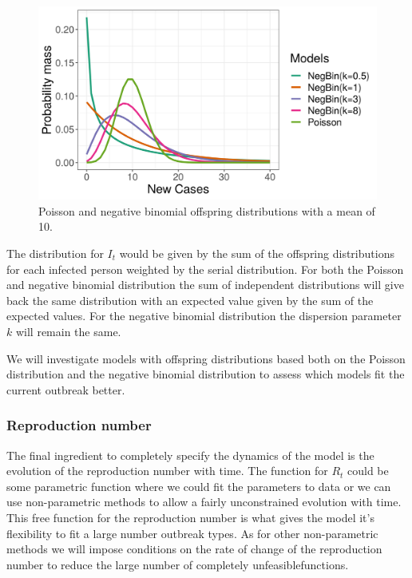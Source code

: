 \documentclass[12pt]{article}
\begin{document}
\begin{figure}[h]
  \centering
  \includegraphics[width=\textwidth]{../output/prob_dist.png}
  \caption{Poisson and negative binomial offspring distributions with a mean of 10.}
  \label{fig:offspring}
\end{figure}

The distribution for $I_t$ would be given by the sum of the offspring distributions for each infected person weighted by the serial distribution. For both the Poisson and negative binomial distribution the sum of independent distributions will give back the same distribution with an expected value given by the sum of the expected values. For the negative binomial distribution the dispersion parameter $k$ will remain the same. 

We will investigate models with offspring distributions based both on the Poisson distribution and the negative binomial distribution to assess which models fit the current outbreak better.

\subsubsection{Reproduction number}
The final ingredient to completely specify the dynamics of the model is the evolution of the reproduction number with time. The function for $R_t$ could be some parametric function where we could fit the parameters to data or we can use non-parametric methods to allow a fairly unconstrained evolution with time. This free function for the reproduction number is what gives the model it's flexibility to fit a large number outbreak types. As for other non-parametric methods we will impose conditions on the rate of change of the reproduction number to reduce the large number of completely unfeasiblefunctions.
\end{document}
